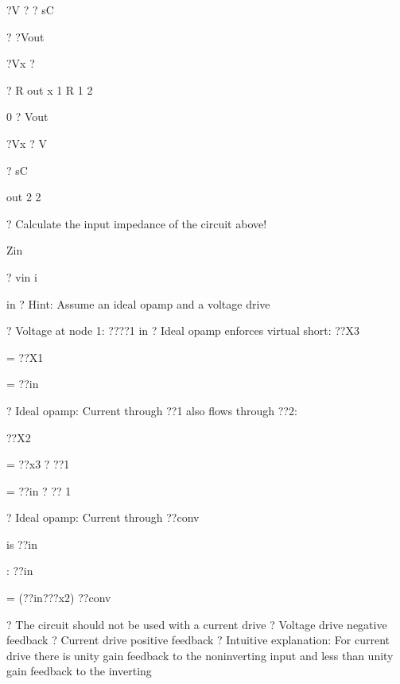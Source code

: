 \documentclass[2pt,landscape]{article}
\begin{document}
\begin{multicols*}{5}
?V ? ? sC


?	?Vout


?Vx ?


? 
R	out	x	1	R
1	2


0 ? Vout


?Vx ? V


? sC


out	2
2







?	Calculate the input impedance of the circuit above!



Zin


? vin
i


in
?	Hint: Assume an ideal opamp and a voltage drive





















?	Voltage at node 1: ????1	in
?	Ideal opamp enforces virtual short: ??X3



= ??X1



= ??in


?	Ideal opamp: Current through ??1 also flows through ??2:


??X2


= ??x3 ?
??1


= 
??in 
?
??
1





?	Ideal opamp: Current through ??conv


is ??in


: ??in


= (??in???x2)
??conv










?	The circuit should not be used with a current drive
?	Voltage drive	negative feedback
?	Current drive	positive feedback
?	Intuitive explanation: For current drive there is unity gain feedback to
the noninverting input and less than unity gain feedback to the inverting










\end{multicols*}
\end{document}
